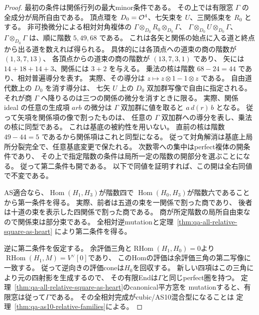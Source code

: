 \begin{proof}
最初の条件は関係行列の最大minor条件である。
その上では有限窓 $\Gamma$ の全成分が局所自由である。
頂点環を $D_0=\mathcal O^4$、七矢束を $U$、三関係束を $R_0$ とする。
非可換微分による相対対角複体の
$\Gamma\otimes_{D_0}R_0\otimes_{D_0}\Gamma$、
$\Gamma\otimes_{D_0}U\otimes_{D_0}\Gamma$、
$\Gamma\otimes_{D_0}\Gamma$ は、順に階数 $5,49,68$ である。
これは各矢と関係の始点に入る道と終点から出る道を数えれば得られる。
具体的には各頂点への道束の商の階数が $(1,3,7,13)$、
各頂点からの道束の商の階数が $(13,7,3,1)$ であり、
矢には $14+18+14+3$、関係には $3+2$ を与える。
乗法の核は階数 $68-24=44$ であり、相対普遍導分を表す。
実際、その導分は $z\mapsto z\otimes1-1\otimes z$ である。
自由道代数上の $D_0$ を消す導分は、
七矢 $U$ 上の $D_0$ 双加群写像で自由に指定される。
それが商 $\Gamma$ へ降りるのは三つの関係の微分を消すときに限る。
実際、関係 ideal の任意の生成項 $a r b$ の微分は
$\Gamma$ 双加群に値を取ると $a\,d(r)\,b$ となる。
従って矢項を関係項の像で割ったものは、
任意の $\Gamma$ 双加群への導分を表し、乗法の核に同型である。
これは基底の被約性を用いない。
直前の核は階数 $49-44=5$ であるから関係項はこれと同型になる。
従って対角解消は基底上局所分裂完全で、任意基底変更で保たれる。
次数零への集中はperfect複体の開条件であり、
その上で指定階数の条件は局所一定の階数の開部分を選ぶことになる。
従って第二条件も開である。
以下で同値を証明すれば、この開は全右同値で不変である。

AS適合なら、$\operatorname{Hom}(H_1,H_3)$が階数四で
$\operatorname{Hom}(H_0,H_3)$が階数六であることから第一条件を得る。
実際、前者は五道の束を一関係で割った商であり、
後者は十道の束を表示した四関係で割った商である。
商が所定階数の局所自由束なので関係束は部分束である。
全相対逆mutationと定理~\ref{thm:qa-all-relative-square-as-heart}
により第二条件を得る。

逆に第二条件を仮定する。
余評価三角と$\operatorname{RHom}(H_1,H_0)=0$より
$\operatorname{RHom}(H_1,M)=V^\vee[0]$であり、
このHomの評価は余評価三角の第二写像に一致する。
従って逆向きの評価coneは$H_0$を回収する。
新しい四項はこの三角により元の四射影を生成するので、
その有限Endは$\Gamma$と同じperfect圏を持つ。
定理~\ref{thm:qa-all-relative-square-as-heart}のcanonical平方窓を
mutationすると、有限窓は従って$\Gamma$である。
その全相対完成がcubic/AS10混合型になることは
定理~\ref{thm:qa-as10-relative-families}による。


\end{proof}
